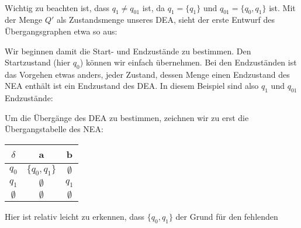\begin{flushleft}
\begin{align}
    \end{align}
    Wichtig zu beachten ist, dass $q_1 \neq q_{01}$ ist, da $q_1=\{q_1\}$ und $q_{01}=\{q_0,q_1\}$ ist.
    Mit der Menge $Q'$ als Zustandsmenge unseres DEA, sieht der erste Entwurf des Übergangsgraphen etwa so aus:
    \begin{center}
    \end{center}
    Wir beginnen damit die Start- und Endzustände zu bestimmen. Den Startzustand (hier $q_0$) können 
    wir einfach übernehmen. Bei den Endzuständen ist das Vorgehen etwas anders, jeder Zustand, dessen Menge 
    einen Endzustand des NEA enthält ist ein Endzustand des DEA. In diesem Beispiel sind also $q_1$ und $q_{01}$
    Endzustände:
    \begin{center}
    \end{center}
    Um die Übergänge des DEA zu bestimmen, zeichnen wir zu erst die Übergangstabelle des NEA:
    \begin{center}
        \begin{tabular}{|c|c|c|}
            \hline
            $\delta$ & a & b \\
            \hline
            $q_0$ & $\{q_0,q_1\}$ & $\emptyset$ \\
            \hline
            $q_1$ & $\emptyset$ & $q_1$ \\
            \hline
            $\emptyset$ & $\emptyset$ & $\emptyset$ \\
            \hline
        \end{tabular}
    \end{center}
    Hier ist relativ leicht zu erkennen, dass $\{q_0,q_1\}$ der Grund für den fehlenden 

\end{flushleft}
